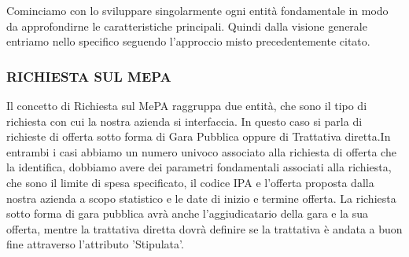 Cominciamo con lo sviluppare singolarmente ogni entità fondamentale in modo da approfondirne le caratteristiche principali. Quindi dalla visione generale entriamo nello specifico seguendo l'approccio misto precedentemente citato.\newline

\subsubsection{RICHIESTA SUL MEPA}
Il concetto di Richiesta sul MePA raggruppa due entità, che sono il tipo di richiesta con cui la nostra azienda si interfaccia. In questo caso si parla di richieste di offerta sotto forma di Gara Pubblica oppure di Trattativa diretta.\newline In entrambi i casi abbiamo un numero univoco associato alla richiesta di offerta che la identifica, dobbiamo avere dei parametri fondamentali associati alla richiesta, che sono il limite di spesa specificato, il codice IPA e l'offerta proposta dalla nostra azienda a scopo statistico e le date di inizio e termine offerta.\newline
La richiesta sotto forma di gara pubblica avrà anche l'aggiudicatario della gara e la sua offerta, mentre la trattativa diretta dovrà definire se la trattativa è andata a buon fine attraverso l'attributo 'Stipulata'.\newline\newline
\noindent{}

